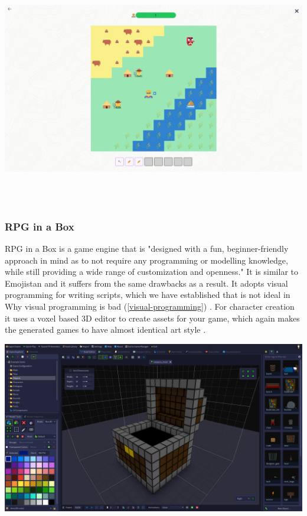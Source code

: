 \documentclass{article}
\begin{document}
\begin{minipage}{\linewidth}
    \centering
    \includegraphics[width=1\textwidth]{emojistan-game.jpeg}
\end{minipage}\\\\

\subsubsection{RPG in a Box}
RPG in a Box is a game engine that is "designed with a fun, beginner-friendly approach in mind as to not require any programming or modelling knowledge, while still providing a wide range of customization and openness." It is similar to Emojistan and it suffers from the same drawbacks as a result. It adopts visual programming for writing scripts, which we have established that is not ideal in Why visual programming is bad (\ref{visual-programming}) . For character creation it uses a voxel based 3D editor to create assets for your game, which again makes the generated games to have almost identical art style \cite{rpg-in-a-box}.

\begin{minipage}{\linewidth}
    \centering
    \includegraphics[width=1\textwidth]{rpg-in-a-box-editor.jpg}
\end{minipage}\\\\
\end{document}
